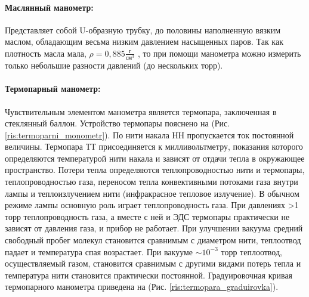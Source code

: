 \documentclass[a4paper,12pt]{article}
\begin{document}
    \begin{figure}[h]
    \end{figure}

    \paragraph{Маслянный манометр:}
    Представляет собой U-образную трубку, до половины наполненную вязким маслом, обладающим весьма низким давлением насыщенных паров. Так как плотность масла мала, $\rho = 0,885 \frac{\text{г}}{\text{см}^3}$ , то при помощи манометра можно измерить только небольшие разности давлений (до нескольких торр).

    \paragraph{Термопарный манометр:}
    Чувствительным элементом манометра является термопара, заключенная в стеклянный баллон. Устройство термопары пояснено на (Рис. \ref{ris:termoparni_monometr}). По нити накала НН пропускается ток постоянной величины. Термопара ТТ присоединяется к милливольтметру, показания которого определяются температурой нити накала и зависят от отдачи тепла в окружающее пространство. Потери тепла определяются теплопроводностью нити и термопары, теплопроводностью газа, переносом тепла конвективными потоками газа внутри лампы и теплоизлучением нити (инфракрасное тепловое излучение). В обычном режиме лампы основную роль играет теплопроводность газа. При давлениях >1 торр теплопроводность газа, а вместе с ней и ЭДС термопары практически не зависят от давления газа, и прибор не работает. При улучшении вакуума средний свободный пробег молекул становится сравнимым с диаметром нити, теплоотвод падает и температура спая возрастает. При вакууме $\sim 10^{-3}$ торр теплоотвод, осуществляемый газом, становится сравнимым с другими видами потерь тепла и температура нити становится практически постоянной. Градуировочная кривая термопарного манометра приведена на (Рис. \ref{ris:termopara_graduirovka}).
\end{document}
